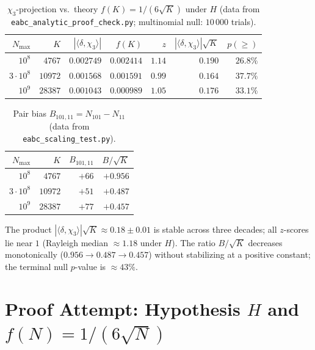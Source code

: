 \documentclass[11pt,a4paper]{article}
\begin{document}
\begin{table}[ht]
\centering
\caption{$\chi_3$-projection vs.\ theory $f(K)=1/(6\sqrt{K})$ under $H$
(data from \texttt{eabc\_analytic\_proof\_check.py};
multinomial null: $10\,000$ trials).}
\label{tab:chi3-scaling}
\begin{tabular}{rrrrrrr}
\toprule
$N_{\max}$ & $K$ & $|\langle\delta,\chi_3\rangle|$ & $f(K)$ & $z$ &
$|\langle\delta,\chi_3\rangle|\sqrt{K}$ & $p(\ge)$ \\
\midrule
$10^8$       & $4767$  & $0.002749$ & $0.002414$ & $1.14$ & $0.190$ & $26.8\%$ \\
$3\cdot10^8$ & $10972$ & $0.001568$ & $0.001591$ & $0.99$ & $0.164$ & $37.7\%$ \\
$10^9$       & $28387$ & $0.001043$ & $0.000989$ & $1.05$ & $0.176$ & $33.1\%$ \\
\bottomrule
\end{tabular}
\end{table}

\begin{table}[ht]
\centering
\caption{Pair bias $B_{101,11}=N_{101}-N_{11}$
(data from \texttt{eabc\_scaling\_test.py}).}
\label{tab:B-scaling}
\begin{tabular}{rrrr}
\toprule
$N_{\max}$ & $K$ & $B_{101,11}$ & $B/\sqrt{K}$ \\
\midrule
$10^8$       & $4767$  & $+66$ & $+0.956$ \\
$3\cdot10^8$ & $10972$ & $+51$ & $+0.487$ \\
$10^9$       & $28387$ & $+77$ & $+0.457$ \\
\bottomrule
\end{tabular}
\end{table}

The product $|\langle\delta,\chi_3\rangle|\sqrt{K}\approx 0.18\pm 0.01$ is
stable across three decades; all $z$-scores lie near $1$ (Rayleigh median
$\approx 1.18$ under $H$).
The ratio $B/\sqrt{K}$ decreases monotonically ($0.956\to 0.487\to 0.457$)
without stabilizing at a positive constant; the terminal null $p$-value is
$\approx 43\%$.

\section{Proof Attempt: Hypothesis $H$ and $f(N)=1/(6\sqrt{N})$}
\label{sec:hypothesis-H}
\end{document}

